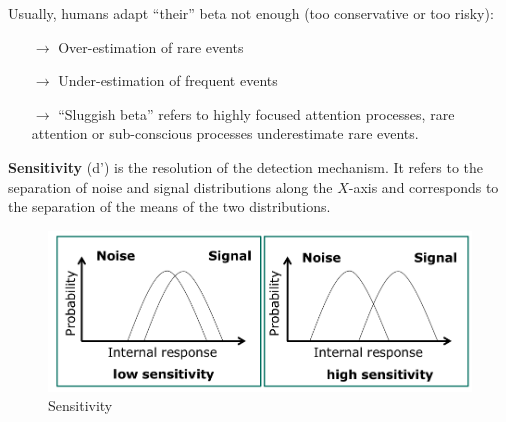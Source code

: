 Usually, humans adapt ``their'' beta not enough (too conservative or too risky):
\begin{itemize}
\item[$\rightarrow$] Over-estimation of rare events
\item[$\rightarrow$] Under-estimation of frequent events
\item[$\rightarrow$] ``Sluggish beta'' refers to highly focused attention processes, rare attention or sub-conscious processes underestimate rare events.
\end{itemize}
\textbf{Sensitivity} (d’) is the resolution of the detection mechanism. It refers to the separation of noise and signal distributions along the $X$-axis and corresponds to the separation of the means of the two distributions.
\begin{figure}[h!]
	\centering
	\includegraphics[width=.5\textwidth]{img/ch03_std3.png}
	\caption{Sensitivity}
	\label{std3}
\end{figure} 

